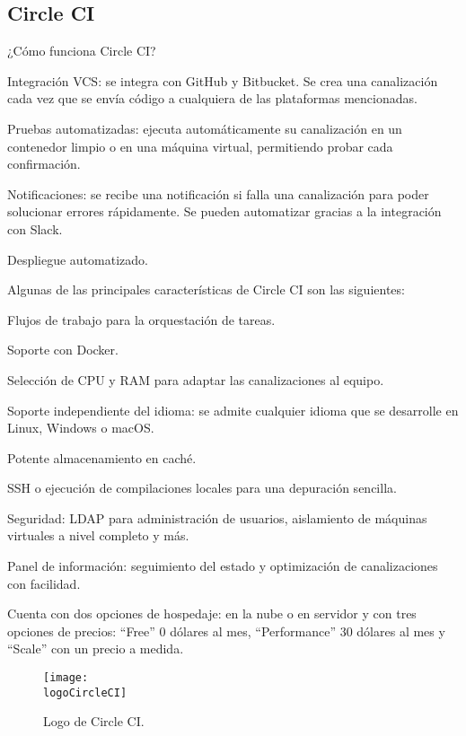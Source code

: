 \subsection{Circle CI}
¿Cómo funciona Circle CI?
\begin{compactitem}
    \item Integración VCS: se integra con GitHub y Bitbucket. Se crea una canalización cada vez que se envía código a cualquiera de las plataformas mencionadas.
    \item Pruebas automatizadas: ejecuta automáticamente su canalización en un contenedor limpio o en una máquina virtual, permitiendo probar cada confirmación.
    \item Notificaciones: se recibe una notificación si falla una canalización para poder solucionar errores rápidamente. Se pueden automatizar gracias a la integración con Slack.
    \item Despliegue automatizado.
\end{compactitem}

Algunas de las principales características de Circle CI son las siguientes:
\begin{compactitem}
    \item Flujos de trabajo para la orquestación de tareas.
    \item Soporte con Docker.
    \item Selección de CPU y RAM para adaptar las canalizaciones al equipo.
    \item Soporte independiente del idioma: se admite cualquier idioma que se desarrolle en Linux, Windows o macOS.
    \item Potente almacenamiento en caché.
    \item SSH o ejecución de compilaciones locales para una depuración sencilla.
    \item Seguridad: LDAP para administración de usuarios, aislamiento de máquinas virtuales a nivel completo y más.
    \item Panel de información: seguimiento del estado y optimización de canalizaciones con facilidad.
\end{compactitem}
Cuenta con dos opciones de hospedaje: en la nube o en servidor y con tres opciones de precios: “Free” 0 dólares al mes, “Performance” 30 dólares al mes y “Scale” con un precio a medida.

\begin{figure}[h]
    \centering
    \texttt{[image: \\logoCircleCI]}
    \caption{Logo de Circle CI.}
\end{figure}

